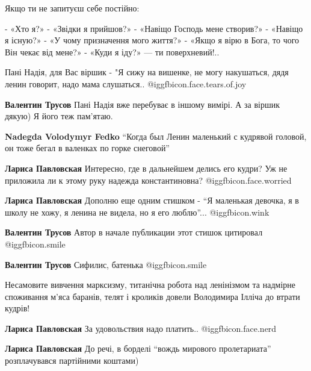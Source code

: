 \begin{itemize}
Якщо ти не запитуєш себе постійно:

\obeycr
- «Хто я?»
- «Звідки я прийшов?»
- «Навіщо Господь мене створив?»
- «Навіщо я існую?»
- «У чому призначення мого життя?»
- «Якщо я вірю в Бога, то чого Він чекає від мене?»
- «Куди я іду?» — ти поверхневий!..
\restorecr


Пані Надія, для Вас віршик - "Я сижу на вишенке, не могу накушаться, дядя ленин
говорит, надо мама слушаться.. @igg{fbicon.face.tears.of.joy} 

\begin{itemize} %
\textbf{Валентин Трусов} Пані Надія вже перебуває в іншому вимірі. А за віршик дякую) Я його теж пам'ятаю.

\begin{itemize} %
\textbf{Nadegda Volodymyr Fedko} \enquote{Когда был Ленин маленький с кудрявой головой, он тоже бегал в валенках по горке снеговой}

\textbf{Лариса Павловская} Интересно, где в дальнейшем делись его кудри? Уж не приложила ли к этому руку надежда константиновна?  @igg{fbicon.face.worried} 

\textbf{Лариса Павловская} Дополню еще одним стишком - \enquote{Я маленькая девочка, я в школу не хожу, я ленина не видела, но я его люблю}...  @igg{fbicon.wink} 

\textbf{Валентин Трусов} Автор в начале публикации этот стишок цитировал  @igg{fbicon.smile} 

\textbf{Валентин Трусов} Сифилис, батенька  @igg{fbicon.smile} 


Несамовите вивчення марксизму, титанічна робота над ленінізмом та надмірне
споживання м'яса баранів, телят і кроликів довели Володимира Ілліча до втрати
кудрів!

\textbf{Лариса Павловская} За удовольствия надо платить.. @igg{fbicon.face.nerd} 


\textbf{Лариса Павловская} До речі, в борделі \enquote{вождь мирового пролетариата} розплачувався партійними коштами)
\end{itemize} %

\end{itemize} %

\end{itemize} %
